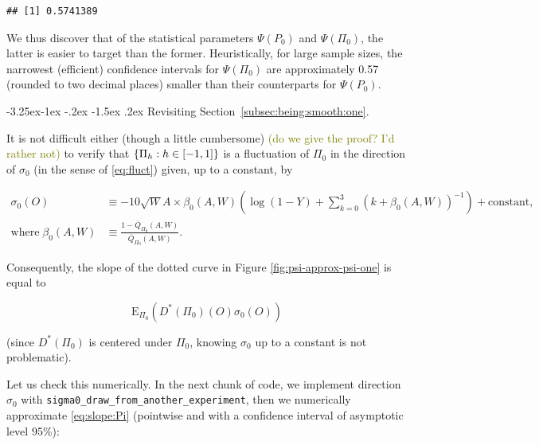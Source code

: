 \documentclass[]{article}
\makeatletter
\renewcommand\subsection{\@startsection{subsection}{3}{\z@}%
                                     {-3.25ex\@plus -1ex \@minus -.2ex}%
                                     {-1.5ex \@plus .2ex}%
                                     {\normalfont\normalsize\bfseries}}
\newcommand{\Exp}{\textrm{E}}
\newcommand{\Qbar}{\bar{Q}}
\newcommand{\tcg}[1]{\textcolor{olive}{#1}}
\theoremstyle{definition}
\theoremstyle{definition}
\theoremstyle{definition}
\theoremstyle{remark}
\makeatother
\begin{document}
\begin{verbatim}
## [1] 0.5741389
\end{verbatim}

We thus discover that of the statistical parameters \(\Psi(P_{0})\) and
\(\Psi(\Pi_{0})\), the latter is easier to target than the former.
Heuristically, for large sample sizes, the narrowest (efficient)
confidence intervals for \(\Psi(\Pi_{0})\) are approximately 0.57
(rounded to two decimal places) smaller than their counterparts for
\(\Psi(P_{0})\).

\subsection{Revisiting Section~\ref{subsec:being:smooth:one}.}

It is not difficult either (though a little cumbersome)
\tcg{(do we give the
proof? I'd rather not)} to verify that
\(\{\Pi_{h} : h \in \interval{-1}{1}\}\) is a fluctuation of \(\Pi_{0}\)
in the direction of \(\sigma_{0}\) (in the sense of \eqref{eq:fluct})
given, up to a constant, by

\begin{align*}\sigma_{0}(O)  &\equiv -  10  \sqrt{W}  A \times  \beta_{0}(A,W)
\left(\log(1    -     Y)    +     \sum_{k=0}^{3}    \left(k     +    \beta_{0}
(A,W)\right)^{-1}\right)     +      \text{constant},\\     \text{where}     \;
\beta_{0}(A,W)&\equiv                                                  \frac{1
-\Qbar_{\Pi_{0}}(A,W)}{\Qbar_{\Pi_{0}}(A,W)}.\end{align*}

Consequently, the slope of the dotted curve in Figure
\ref{fig:psi-approx-psi-one} is equal to

\begin{equation}\label{eq:slope:Pi}\Exp_{\Pi_{0}}      (D^{*}(\Pi_{0})     (O)
\sigma_{0}(O))\end{equation}

(since \(D^{*}(\Pi_{0})\) is centered under \(\Pi_{0}\), knowing
\(\sigma_{0}\) up to a constant is not problematic).

Let us check this numerically. In the next chunk of code, we implement
direction \(\sigma_{0}\) with
\texttt{sigma0\_draw\_from\_another\_experiment}, then we numerically
approximate \eqref{eq:slope:Pi} (pointwise and with a confidence
interval of asymptotic level 95\%):
\end{document}

